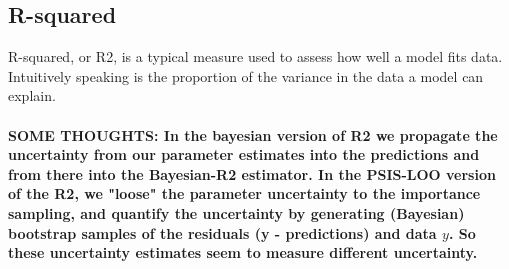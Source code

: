 \documentclass{article}
\begin{document}
\subsection{R-squared}



R-squared, or R2, is a typical measure used to assess how well a model fits data. Intuitively speaking is the proportion of the variance in the data a model can explain. 
\\ \\
\textbf{SOME THOUGHTS: In the bayesian version of R2 we propagate the uncertainty from our parameter estimates into the predictions and from there into the Bayesian-R2 estimator. In the PSIS-LOO version of the R2, we "loose" the parameter uncertainty to the importance sampling, and quantify the uncertainty by generating (Bayesian) bootstrap samples of the residuals (y - predictions) and data $y$. So these uncertainty estimates seem to measure different uncertainty.}
\\ \\
\end{document}
